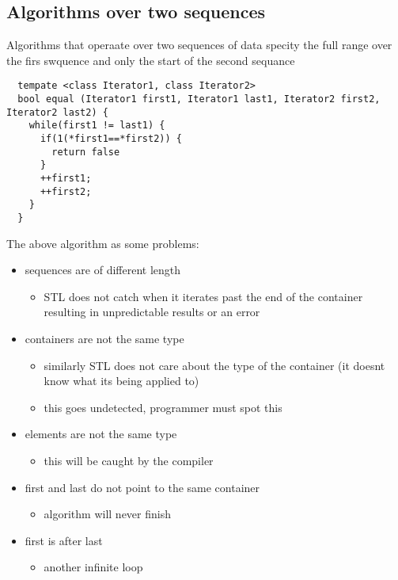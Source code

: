 \documentclass[12pt]{article}
\begin{document}
\subsection*{Algorithms over two sequences}
Algorithms that operaate over two sequences of data specity the full range over the firs swquence and only the start of the second sequance

\begin{lstlisting}
  tempate <class Iterator1, class Iterator2>
  bool equal (Iterator1 first1, Iterator1 last1, Iterator2 first2, Iterator2 last2) {
    while(first1 != last1) {
      if(1(*first1==*first2)) {
        return false
      }
      ++first1;
      ++first2;
    }
  }
\end{lstlisting}

The above algorithm as some problems:
\begin{itemize}
  \item sequences are of different length
  \begin{itemize}
    \item STL does not catch when it iterates past the end of the container resulting in unpredictable results or an error
  \end{itemize}
  \item containers are not the same type
  \begin{itemize}
    \item similarly STL does not care about the type of the container (it doesnt know what its being applied to)
    \item this goes undetected, programmer must spot this
  \end{itemize}
  \item elements are not the same type
  \begin{itemize}
    \item this will be caught by the compiler
  \end{itemize}
  \item first and last do not point to the same container
  \begin{itemize}
    \item algorithm will never finish
  \end{itemize}
  \item first is after last
  \begin{itemize}
    \item another infinite loop
  \end{itemize}
\end{itemize}
\end{document}
